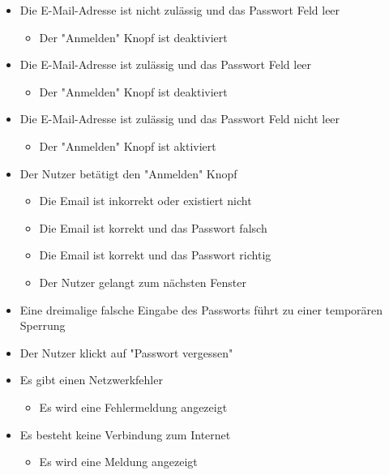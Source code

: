 \begin{itemize}
    \item Die E-Mail-Adresse ist nicht zulässig und das Passwort Feld leer
    \begin{itemize}
        \item Der "Anmelden" Knopf ist deaktiviert
     \end{itemize}
    \item Die E-Mail-Adresse ist zulässig und das Passwort Feld leer
    \begin{itemize}
        \item Der "Anmelden" Knopf ist deaktiviert
    \end{itemize}
    \item Die E-Mail-Adresse ist zulässig und das Passwort Feld nicht leer
    \begin{itemize}
        \item Der "Anmelden" Knopf ist aktiviert
    \end{itemize}
    \item Der Nutzer betätigt den "Anmelden" Knopf
    \begin{itemize}
        \item Die Email ist inkorrekt oder existiert nicht
        \item Die Email ist korrekt und das Passwort falsch
        \item Die Email ist korrekt und das Passwort richtig
    \end{itemize}
    \begin{itemize}
        \item Der Nutzer gelangt zum nächsten Fenster
    \end{itemize}
    \item Eine dreimalige falsche Eingabe des Passworts führt zu einer temporären Sperrung
    \item Der Nutzer klickt auf "Passwort vergessen"
    \item Es gibt einen Netzwerkfehler
    \begin{itemize}
        \item Es wird eine Fehlermeldung angezeigt
    \end{itemize}
    \item Es besteht keine Verbindung zum Internet
    \begin{itemize}
        \item Es wird eine Meldung angezeigt
\end{itemize}


\end{itemize}

